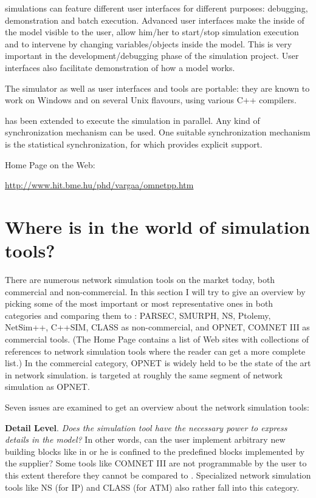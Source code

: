 {\opp} simulations can feature different user interfaces for
different purposes: debugging, demonstration and batch execution.
Advanced user interfaces make the inside of the model visible
to the user, allow him/her to start/stop simulation execution
and to intervene by changing variables/objects inside the model.
This is very important in the development/debugging phase
of the simulation project. User interfaces also facilitate demonstration
of how a model works.

The simulator as well as user interfaces and tools are portable:
they are known to work on Windows and on several Unix flavours,
using various C++ compilers.

{\opp} has been extended to execute the simulation in parallel.
Any kind of synchronization mechanism can be used. One suitable
synchronization mechanism is the statistical synchronization,
for which {\opp} provides explicit support.


{\opp} Home Page on the Web:


\href{http://www.hit.bme.hu/phd/vargaa/omnetpp.htm}{http://www.hit.bme.hu/phd/vargaa/omnetpp.htm}





\section{Where is {\opp} in the world of simulation tools?}

There are numerous network simulation tools on the market today,
both commercial and non-commercial. In this section I will try
to give an overview by picking some of the most important or
most representative ones in both categories and comparing them
to {\opp}: PARSEC, SMURPH, NS, Ptolemy, NetSim++, C++SIM, CLASS
as non-commercial, and OPNET, COMNET III as commercial tools.
(The {\opp} Home Page contains a list of Web sites with collections
of references to network simulation tools where the reader can
get a more complete list.) In the commercial category, OPNET
is widely held to be the state of the art in network simulation.
{\opp} is targeted at roughly the same segment of network simulation
as OPNET.{\nobreakspace}


Seven issues are examined to get an overview about the network
simulation tools:


\textbf{Detail Level}. \textit{Does the simulation tool have the necessary
power to express details in the model?} In other words, can the
user implement arbitrary new building blocks like in {\opp}
or he is confined to the predefined blocks implemented by the
supplier? Some tools like COMNET III are not programmable by
the user to this extent therefore they cannot be compared to
{\opp}. Specialized network simulation tools like NS (for IP)
and CLASS (for ATM) also rather fall into this category.


